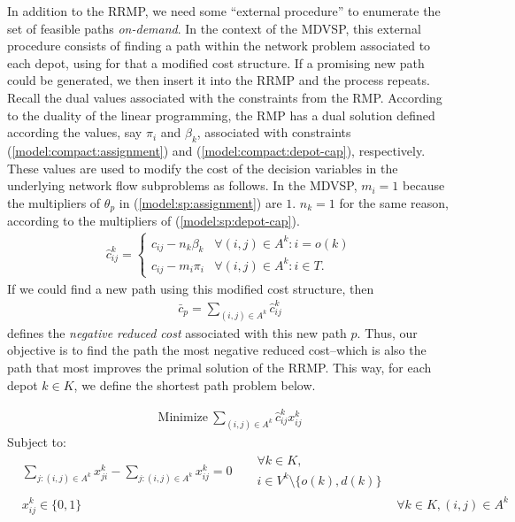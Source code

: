 \documentclass{article}
\begin{document}
In addition to the RRMP, we need some ``external procedure''
to enumerate the set of feasible paths \textit{on-demand}. In the context of the MDVSP, this external procedure consists of finding a path within the network problem associated to each depot, using for that a modified cost structure. If a promising new path could be generated, we then insert it into the RRMP and the process repeats. Recall the dual values associated with the constraints from the RMP. According to the duality of the linear programming, the RMP has a dual solution defined according the values, say $\pi_i$ and $\beta_k$, associated with constraints (\ref{model:compact:assignment}) and (\ref{model:compact:depot-cap}), respectively. These values are used to modify the cost of the decision variables in the underlying network flow subproblems as follows. In the MDVSP, $m_i = 1$ because the multipliers of $\theta_p$ in (\ref{model:sp:assignment}) are $1$. $n_k = 1$ for the same reason, according to the multipliers of (\ref{model:sp:depot-cap}).
\begin{align}
   \hat{c}^k_{ij} =
   \begin{cases}
      c_{ij} - n_k\beta_k & \forall (i,j) \in A^k : i = o(k)\\
      c_{ij} - m_i\pi_i & \forall (i,j) \in A^k : i \in T.
   \end{cases}
\end{align}
If we could find a new path using this modified cost structure, then
\begin{align}
   \bar{c}_p = \sum_{(i,j) \in A^k} \hat{c}^k_{ij}
\end{align}
defines the \textit{negative reduced cost} associated with this new path $p$. Thus, our objective is to find the path the most negative reduced cost--which is also the path that most improves the primal solution of the RRMP. This way, for each depot $k \in K$, we define the shortest path problem below.

\noindent
\begin{minipage}{\linewidth}
   \begin{align}
      \mathrm{Minimize~}\sum_{(i,j) \in A^k} \hat{c}^k_{ij} x^k_{ij} \label{model:pricing:obj}
   \end{align}
   \qquad Subject to:
   \begin{align}
      & \sum_{j : (i,j) \in A^k} x^k_{ji} - \sum_{j : (i,j) \in A^k} x^k_{ij} = 0 &
      \begin{split}
         & \forall k \in K, \\
         & i \in V^k \setminus \{o(k), d(k)\}
      \end{split} \label{model:pricing:flow-conserv}\\[4pt]
      & x^k_{ij} \in \{0, 1\} & & \forall k \in K, (i,j) \in A^k \label{model:pricing:domain}
   \end{align}
\end{minipage}
\end{document}
